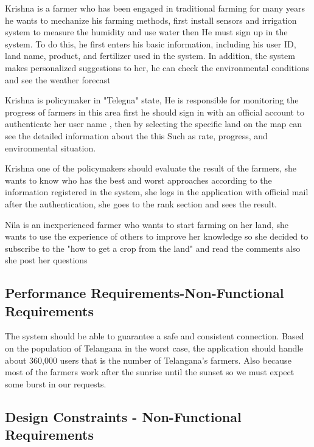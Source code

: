 Krishna is a farmer who has been engaged in traditional farming for many years he wants to 
mechanize his farming methods, first install sensors and irrigation system to measure the humidity and use water then  He must sign up in the system. To do this, he first enters his basic information, including his user ID, land name, product, and fertilizer used in the system.
In addition, the system makes personalized suggestions to her, he can check the environmental conditions  and see the weather forecast 
\newline
\newline

Krishna is policymaker in "Telegna" state, He is responsible for monitoring the progress of farmers in this area first he should sign in with an official account to authenticate her user name , then by selecting the specific land on the map can see the detailed information about the this
Such as rate, progress, and environmental situation. 
\newline
\newline

Krishna one of the policymakers should evaluate the result of the farmers, she wants to know who has the best and worst approaches according to the information registered in the system, she logs in the application with official mail after the authentication, she goes to the rank section and sees the result.
\newline
\newline

Nila is an inexperienced farmer who wants to start farming on her land, she wants to use the experience of others to improve her knowledge so she decided to subscribe to the "how to get a crop from the land" and read the comments also she post her questions 

\newline
\subsection{Performance Requirements-Non-Functional Requirements}
The system should be able to guarantee a safe and consistent connection. Based on the population of Telangana in the worst case, the application should handle about 360,000 users that is the number of Telangana’s farmers. Also because most of the farmers work after the sunrise until the sunset so we must expect some burst in our requests. 
\subsection{Design Constraints - Non-Functional Requirements}
